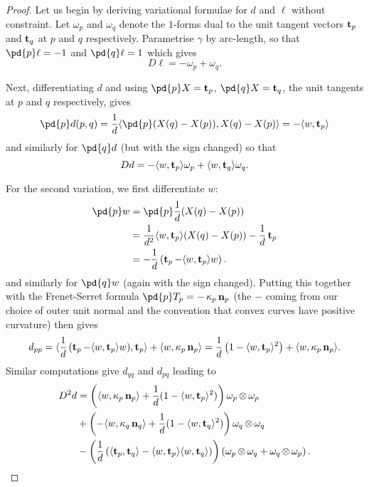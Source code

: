 \documentclass[11pt]{amsart}
\begin{document}
\begin{proof}
Let us begin by deriving variational formulae for $d$ and $\ell$ without constraint. Let $\omega_p$ and $\omega_q$ denote the $1$-forms dual to the unit tangent vectors $\operatorname{\mathbf{t}}_p$ and $\operatorname{\mathbf{t}}_q$ at $p$ and $q$ respectively. Parametrise $\gamma$ by arc-length, so that $\pd{p} \ell = - 1$ and $\pd{q} \ell = 1$ which gives 
\begin{equation}
\label{eq:l_first_var}
D\ell = -\omega_p + \omega_q.
\end{equation}

Next, differentiating $d$ and using $\pd{p}X = \tang_p$, $\pd{q}X = \tang_q$, the unit tangents at $p$ and $q$ respectively, gives
\[
\pd{p} d (p, q) = \frac{1}{d} \ip{\pd{p}(X(q) - X(p))}{X(q) - X(p)} = -\ip{w}{\tang_p}
\]
and similarly for $\pd{q} d$ (but with the sign changed) so that
\begin{equation}
\label{eq:d_first_var}
Dd = -\langle{w},{\operatorname{\mathbf{t}}_p}\rangle \omega_p + \langle{w},{\operatorname{\mathbf{t}}_q}\rangle \omega_q.
\end{equation}

For the second variation, we first differentiate $w$:
\[
\begin{split}
\pd{p} w &= \pd{p} \frac{1}{d} (X(q) - X(p)) \\
&= \frac{1}{d^2} \ip{w}{\tang_p} (X(q) - X(p)) - \frac{1}{d} \tang_p \\
&= -\frac{1}{d}\left(\tang_p - \ip{w}{\tang_p} w\right).
\end{split}
\]
and similarly for $\pd{q} w$ (again with the sign changed).  Putting this together with the Frenet-Serret formula $\pd{p} T_p = -\curvecurv_p \nor_p$ (the $-$ coming from our choice of outer unit normal and the convention that convex curves have positive curvature) then gives
\[
d_{pp} = \langle{\frac{1}{d}\left(\operatorname{\mathbf{t}}_p - \ensuremath{\langle{w},{\operatorname{\mathbf{t}}_p}\rangle} w\right)},{\operatorname{\mathbf{t}}_p}\rangle + \langle{w},{\operatorname{\kappa}_p \operatorname{\mathbf{n}}_p}\rangle = \frac{1}{d}\left(1 - \langle{w},{\operatorname{\mathbf{t}}_p}\rangle^2\right) + \langle{w},{\operatorname{\kappa}_p \operatorname{\mathbf{n}}_p}\rangle.
\]
Similar computations give $d_{qq}$ and $d_{pq}$ leading to
\begin{equation}
\label{eq:d_second_var}
\begin{split}
D^2d &= \left(\langle{w},{\operatorname{\kappa}_p \operatorname{\mathbf{n}}_p}\rangle + \frac{1}{d}(1 - \langle{w},{\operatorname{\mathbf{t}}_p}\rangle^2) \right) \omega_p \operatorname{\otimes} \omega_p \\
&+ \left(-\langle{w},{\operatorname{\kappa}_q \operatorname{\mathbf{n}}_q}\rangle + \frac{1}{d}(1 - \langle{w},{\operatorname{\mathbf{t}}_q}\rangle^2) \right) \omega_q \operatorname{\otimes} \omega_q \\
&- \left(\frac{1}{d}\left(\langle{\operatorname{\mathbf{t}}_p},{\operatorname{\mathbf{t}}_q}\rangle - \langle{w},{\operatorname{\mathbf{t}}_p}\rangle\langle{w},{\operatorname{\mathbf{t}}_q}\rangle\right) \right) \left(\omega_p \operatorname{\otimes} \omega_q + \omega_q \operatorname{\otimes} \omega_p\right).
\end{split}
\end{equation}


\end{proof}
\end{document}
